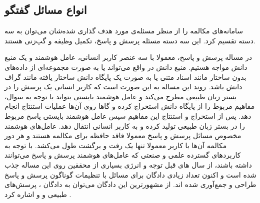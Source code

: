 \subsection{‌انواع مسائل گفتگو}

سامانه‌های مکالمه را از منظر
مسئله‌ی مورد هدف گذاری شده‌شان می‌توان به سه دسته تقسیم کرد. این سه دسته مسئله پرسش و پاسخ، تکمیل وظیفه و گپ‌زنی 
هستند.

در مساله پرسش و پاسخ، معمولا با سه عنصر کاربر انسانی، عامل هوشمند و یک منبع دانش مواجه هستیم. منبع دانش در واقع می‌تواند یا به صورت مجموعه‌ای از داده‌های بدون ساختار مانند اسناد متنی یا به صورت یک پایگاه دانش ساختار یافته مانند گراف دانش باشد. روند این مساله به این صورت است که کاربر انسانی یک پرسش را در بستر زبان طبیعی مطرح می‌کند و عامل هوشمند بایستی بتواند با توجه به سوال، مفاهیم مربوط را از پایگاه دانش استخراج کرده و گاها روی آن‌ها عملیات استنتاج انجام دهد. پس از استخراج و استنتاج این مفاهیم سپس عامل هوشمند بایستی پاسخ مربوط را در بستر زبان طبیعی تولید کرده و به کاربر انسانی انتقال دهد.
عامل‌های هوشمند مخصوص مسائل پرسش و پاسخ معمولا فاقد حافظه برای مکالمه هستند و هر دور مکالمه آن‌ها با کاربر معمولا تنها یک رفت و برگشت طول می‌کشد. با توجه به کاربرد‌های گسترده علمی و صنعتی که عامل‌های هوشمند پرسش و پاسخ می‌توانند داشته باشند، از سال های قبل توجه و انرژی بسیاری از محققین روی این مساله جذب شده است و اکنون تعداد زیادی دادگان برای مسائل با تنظیمات گوناگون پرسش و پاسخ طراحی و جمع‌آوری شده اند. از مشهورترین این دادگان می‌توان به دادگان 
، پرسش‌های طبیعی و 
  و 
   اشاره کرد
\cite{squad_paper, cnnqa_paper, naturalqa_paper, wikiqa_paper}.




